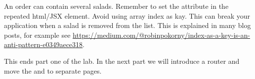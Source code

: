 \documentclass[fleqn, article, a4paper]{memoir}
\begin{document}
\begin{Assignments}
An order can contain several salads. Remember to set the  attribute in the repeated html/JSX element. Avoid using array index as kay. This can break your application when a salad is removed from the list. This is explained in many blog posts, for example see \url{https://medium.com/@robinpokorny/index-as-a-key-is-an-anti-pattern-e0349aece318}.

\item This ends part one of the lab. In the next part we will introduce a router and move the  and  to separate pages.

\end{Assignments}
\end{document}
